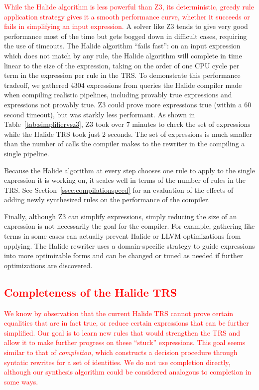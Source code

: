 \documentclass[acmsmall,review]{acmart}\settopmatter{printfolios=true,printccs=false,printacmref=false}
\newcommand{\modified}[1]{\textcolor{red}{{#1}}}
\begin{document}
\modified{While the Halide algorithm is less powerful than Z3, its deterministic, greedy rule application strategy
gives it a smooth performance curve, whether it succeeds or fails in simplifying an input expression. }
A solver like Z3 tends to give very good performance most of the time but gets bogged down in difficult cases, requiring the use of timeouts. The Halide algorithm ``fails fast'': on an input expression which does not match by any rule,  the Halide algorithm will complete in time linear to the size of the expression, taking on the order of one CPU cycle per term in the expression per rule in the TRS. To demonstrate this performance tradeoff, we gathered 4304 expressions from queries the Halide compiler made when compiling realistic pipelines, including provably true expressions and expressions not provably true. Z3 could prove more expressions true (within a 60 second timeout), but was starkly less performant. As shown in Table~\ref{tab:simplifiervsz3}, Z3 took over 7 minutes to check the set of expressions while the Halide TRS took just 2 seconds. The set of expressions is much smaller than the number of calls the compiler makes to the rewriter in the compiling a single pipeline.

Because the Halide algorithm at every step chooses one rule to apply to the single expression it is working on, it scales well in terms of the number of rules in the TRS. See Section~\ref{ssec:compilationspeed} for an evaluation of the effects of adding newly synthesized rules on the performance of the compiler. 

Finally, although Z3 can simplify expressions, simply reducing the size of an expression is not necessarily the goal for the compiler. For example, gathering like terms in some cases can actually prevent Halide or LLVM optimizations from applying. The Halide rewriter uses a domain-specific strategy to guide expressions into more optimizable forms and can be changed or tuned as needed if further optimizations are discovered. 

\subsection{\modified{Completeness of the Halide TRS}}
\label{sec:completion}

\modified{We know by observation that the current Halide TRS cannot prove certain equalities 
that are in fact true, or reduce certain expressions that can be further simplified. 
Our goal is to learn new rules that would strengthen the TRS and allow it to make
further progress on these ``stuck'' expressions. This goal seems similar to that of 
\emph{completion}, which constructs a decision procedure through syntatic rewrites
for a set of identities. We do not use completion directly, although
our synthesis algorithm could be considered analogous to completion in some ways.}
\end{document}
